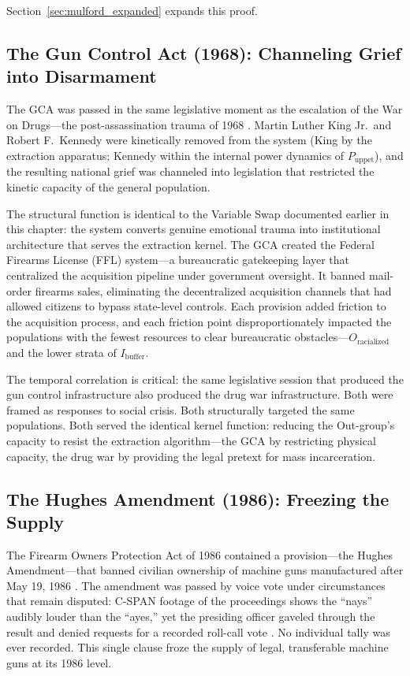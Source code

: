 Section~\ref{sec:mulford_expanded} expands this proof.

\subsection{The Gun Control Act (1968): Channeling Grief into Disarmament}

The GCA was passed in the same legislative moment as the escalation of the War on Drugs---the post-assassination trauma of 1968 \cite{gca1968}. Martin Luther King Jr.\ and Robert F.\ Kennedy were kinetically removed from the system (King by the extraction apparatus; Kennedy within the internal power dynamics of $P_{\text{uppet}}$), and the resulting national grief was channeled into legislation that restricted the kinetic capacity of the general population.

The structural function is identical to the Variable Swap documented earlier in this chapter: the system converts genuine emotional trauma into institutional architecture that serves the extraction kernel. The GCA created the Federal Firearms License (FFL) system---a bureaucratic gatekeeping layer that centralized the acquisition pipeline under government oversight. It banned mail-order firearms sales, eliminating the decentralized acquisition channels that had allowed citizens to bypass state-level controls. Each provision added friction to the acquisition process, and each friction point disproportionately impacted the populations with the fewest resources to clear bureaucratic obstacles---$O_{\text{racialized}}$ and the lower strata of $I_{\text{buffer}}$.

The temporal correlation is critical: the same legislative session that produced the gun control infrastructure also produced the drug war infrastructure. Both were framed as responses to social crisis. Both structurally targeted the same populations. Both served the identical kernel function: reducing the Out-group's capacity to resist the extraction algorithm---the GCA by restricting physical capacity, the drug war by providing the legal pretext for mass incarceration.

\subsection{The Hughes Amendment (1986): Freezing the Supply}

The Firearm Owners Protection Act of 1986 contained a provision---the Hughes Amendment---that banned civilian ownership of machine guns manufactured after May 19, 1986 \cite{hughes1986}. The amendment was passed by voice vote under circumstances that remain disputed: C-SPAN footage of the proceedings shows the ``nays'' audibly louder than the ``ayes,'' yet the presiding officer gaveled through the result and denied requests for a recorded roll-call vote \cite{vizzard2000}. No individual tally was ever recorded. This single clause froze the supply of legal, transferable machine guns at its 1986 level.

